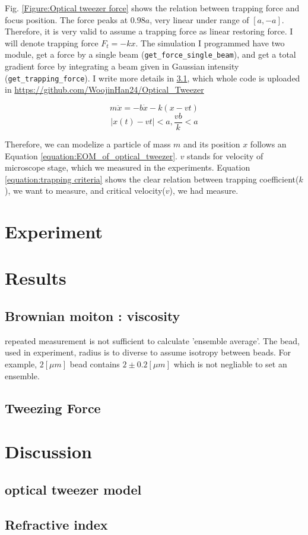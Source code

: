\documentclass{article}
\begin{document}
Fig. \ref{Figure:Optical tweezer force} shows the relation between trapping force and focus position. The force peaks at $0.98a$, very linear under range of $[a,-a]$.
Therefore, it is very valid to assume a trapping force as linear restoring force. I will denote trapping force $F_t = -kx$. The simulation I programmed have two module, get a force by a single beam (\verb|get_force_single_beam|), and get a total gradient force by integrating a beam given in Gaussian intensity (\verb|get_trapping_force|).
I write more details in \ref{discussion:optical_tweezer_simulation}, which whole code is uploaded in \url{https://github.com/WoojinHan24/Optical_Tweezer}

\begin{equation}
    m \ddot{x} =-b\dot{x} -k(x-vt)
    \label{equation:EOM_of_optical_tweezer}
\end{equation}
\begin{equation}
    |x(t) - vt| < a ,    \frac{vb}{k} < a 
    \label{equation:trapping criteria}
\end{equation}

Therefore, we can modelize a particle of mass $m$ and its position $x$ follows an Equation \ref{equation:EOM_of_optical_tweezer}. $v$ stands for velocity of microscope stage, which we measured in the experiments.
Equation \ref{equation:trapping criteria} shows the clear relation between trapping coefficient($k$), we want to measure, and critical velocity($v$), we had measure.


\section{Experiment}

\section{Results}
\subsection{Brownian moiton : viscosity}
\label{results:brownian_motion_raw_fig}
repeated measurement is not sufficient to calculate 'ensemble average'.
The bead, used in experiment, radius is to diverse to assume isotropy between beads.
For example, $2 [\mu m]$ bead contains $2 \pm 0.2 [\mu m]$ which is not negliable to set an ensemble.
\cite{polybead_spec}
\label{results:viscosity}
\label{results:modified_brownian_analysis}
\subsection{Tweezing Force}
\label{results:tweezing_force}

\section{Discussion}


\subsection{optical tweezer model}
\label{discussion:optical_tweezer_simulation}
\subsection{Refractive index}
\label{discussion:refractive_index_calculation}



\end{document}
